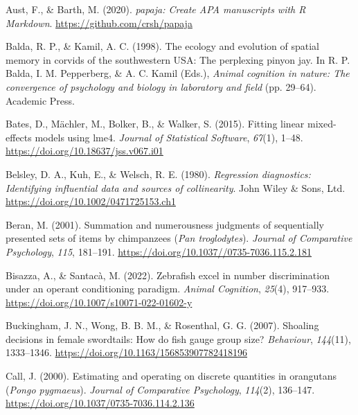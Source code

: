 \documentclass[
  ,pub,floatsintext]{apa6}
\newlength{\cslhangindent}
\newlength{\cslentryspacingunit} %
\newenvironment{CSLReferences}[2] %
 {%
  \setlength{\parindent}{0pt}
  \ifodd #1
  \let\oldpar\par
  \def\par{\hangindent=\cslhangindent\oldpar}
  \fi
  \setlength{\parskip}{#2\cslentryspacingunit}
 }%
 {}
\begin{document}
\begin{CSLReferences}{1}{0}
\leavevmode{}%
Aust, F., \& Barth, M. (2020). \emph{{papaja}: {Create} {APA} manuscripts with {R Markdown}}. \url{https://github.com/crsh/papaja}

\leavevmode{}%
Balda, R. P., \& Kamil, A. C. (1998). The ecology and evolution of spatial memory in corvids of the southwestern USA: The perplexing pinyon jay. In R. P. Balda, I. M. Pepperberg, \& A. C. Kamil (Eds.), \emph{Animal cognition in nature: The convergence of psychology and biology in laboratory and field} (pp. 29--64). Academic Press.

\leavevmode{}%
Bates, D., Mächler, M., Bolker, B., \& Walker, S. (2015). Fitting linear mixed-effects models using {lme4}. \emph{Journal of Statistical Software}, \emph{67}(1), 1--48. \url{https://doi.org/10.18637/jss.v067.i01}

\leavevmode{}%
Belsley, D. A., Kuh, E., \& Welsch, R. E. (1980). \emph{Regression diagnostics: Identifying influential data and sources of collinearity}. John Wiley \& Sons, Ltd. \url{https://doi.org/10.1002/0471725153.ch1}

\leavevmode{}%
Beran, M. (2001). Summation and numerousness judgments of sequentially presented sets of items by chimpanzees (\emph{{Pan} troglodytes}). \emph{Journal of Comparative Psychology}, \emph{115}, 181--191. \url{https://doi.org/10.1037//0735-7036.115.2.181}

\leavevmode{}%
Bisazza, A., \& Santacà, M. (2022). Zebrafish excel in number discrimination under an operant conditioning paradigm. \emph{Animal Cognition}, \emph{25}(4), 917--933. \url{https://doi.org/10.1007/s10071-022-01602-y}

\leavevmode{}%
Buckingham, J. N., Wong, B. B. M., \& Rosenthal, G. G. (2007). Shoaling decisions in female swordtails: {How} do fish gauge group size? \emph{Behaviour}, \emph{144}(11), 1333--1346. \url{https://doi.org/10.1163/156853907782418196}

\leavevmode{}%
Call, J. (2000). Estimating and operating on discrete quantities in {orangutans} (\emph{{Pongo} pygmaeus}). \emph{Journal of Comparative Psychology}, \emph{114}(2), 136--147. \url{https://doi.org/10.1037/0735-7036.114.2.136}


\end{CSLReferences}
\end{document}
